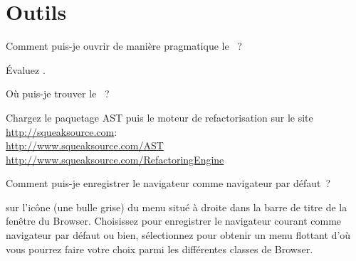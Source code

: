 \documentclass[a4paper,10pt,twoside]{book}
\begin{document}
\section{Outils}

\begin{faq}
Comment puis-je ouvrir de manière pragmatique le  ~?
\end{faq}
\answer
Évaluez .

\begin{faq}
Où puis-je trouver le ~?
\end{faq}
\answer
Chargez le paquetage AST puis le moteur de 
refactorisation sur le site \url{http://squeaksource.com}:\\
\url{http://www.squeaksource.com/AST}\\
\url{http://www.squeaksource.com/RefactoringEngine} %

\begin{faq}
Comment puis-je enregistrer le navigateur comme navigateur par défaut~?
\end{faq}
\answer
\Clickz{} sur l'icône (une bulle grise) du menu situé à droite dans la barre de
titre de la fenêtre du Browser. %
Choisissez  pour enregistrer le navigateur courant comme navigateur par défaut ou bien, sélectionnez  pour obtenir un menu flottant d'où vous pourrez faire votre choix parmi les différentes classes de Browser.

\end{document}
